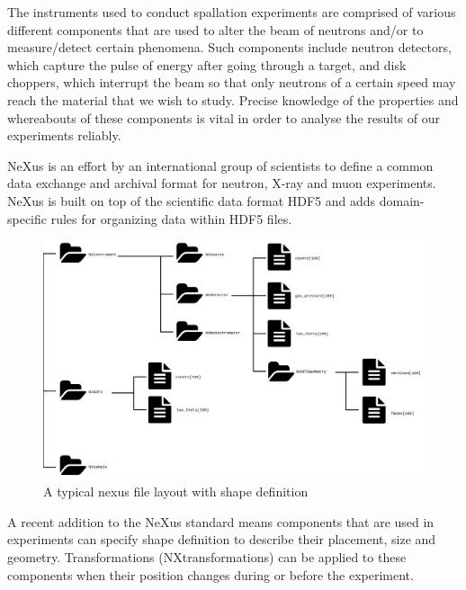 The instruments used to conduct spallation experiments are comprised of various different components that are used to alter the beam of neutrons and/or to measure/detect certain phenomena. Such components include neutron detectors, which capture the pulse of energy after going through a target, and disk choppers, which interrupt the beam so that only neutrons of a certain speed may reach the material that we wish to study. Precise knowledge of the properties and whereabouts of these components is vital in order to analyse the results of our experiments reliably. 

NeXus is an effort by an international group of scientists to define a common data exchange and archival format for neutron, X-ray and muon experiments. NeXus is built on top of the scientific data format HDF5 and adds domain-specific rules for organizing data within HDF5 files.

\begin{figure}
\caption{A typical nexus file layout with shape definition}
\includegraphics[width=\linewidth]{nexusdiagram.png}
\end{figure}

A recent addition to the NeXus standard means components that are used in experiments can specify shape definition to describe their placement, size and geometry. Transformations (NXtransformations) can be applied to these components when their position changes during or before the experiment. 
